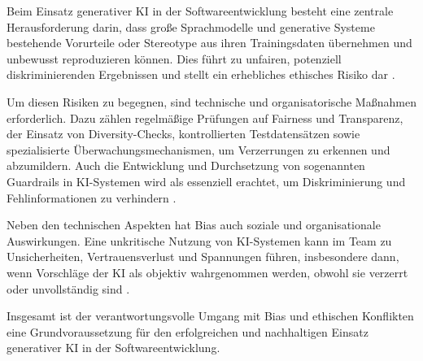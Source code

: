 
Beim Einsatz generativer KI in der Softwareentwicklung besteht eine zentrale
Herausforderung darin, dass große Sprachmodelle und generative Systeme
bestehende Vorurteile oder Stereotype aus ihren Trainingsdaten übernehmen und
unbewusst reproduzieren können. Dies führt zu unfairen, potenziell
diskriminierenden Ergebnissen und stellt ein erhebliches ethisches Risiko dar
\cite{weisz_design_2024}.

Um diesen Risiken zu begegnen, sind technische und organisatorische Maßnahmen
erforderlich. Dazu zählen regelmäßige Prüfungen auf Fairness und Transparenz,
der Einsatz von Diversity-Checks, kontrollierten Testdatensätzen sowie
spezialisierte Überwachungsmechanismen, um Verzerrungen zu erkennen und
abzumildern. Auch die Entwicklung und Durchsetzung von sogenannten Guardrails
in KI-Systemen wird als essenziell erachtet, um Diskriminierung und
Fehlinformationen zu verhindern \cite{weisz_design_2024,
    schmitt_generative_2024}.

Neben den technischen Aspekten hat Bias auch soziale und organisationale
Auswirkungen. Eine unkritische Nutzung von KI-Systemen kann im Team zu
Unsicherheiten, Vertrauensverlust und Spannungen führen, insbesondere dann,
wenn Vorschläge der KI als objektiv wahrgenommen werden, obwohl sie verzerrt
oder unvollständig sind \cite{schmitt_generative_2024}.

Insgesamt ist der verantwortungsvolle Umgang mit Bias und ethischen Konflikten
eine Grundvoraussetzung für den erfolgreichen und nachhaltigen Einsatz
generativer KI in der Softwareentwicklung.
